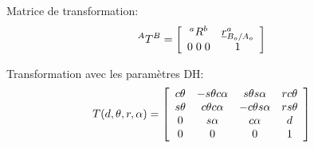 Matrice de transformation:
\begin{align}
{}^AT^B &= 
\left[ \begin{array}{c c } 
^aR^b & \underline{r}_{B_o/A_o}^a \\ 0 \; 0 \; 0 & 1
\end{array} \right] 
\end{align} 


Transformation avec les paramètres DH:
\begin{align}
T(d,\theta,r,\alpha) &=
\left[ \begin{array}{c c c c }
c\theta & -s\theta c\alpha & s\theta s\alpha & r c\theta\\
s\theta & c\theta c\alpha  & -c\theta s\alpha  & r s\theta\\
0 & s\alpha & c\alpha  &  d\\
0 & 0 & 0 & 1 
\end{array}  \right]  
\label{eq:Tdh}
\end{align} 

